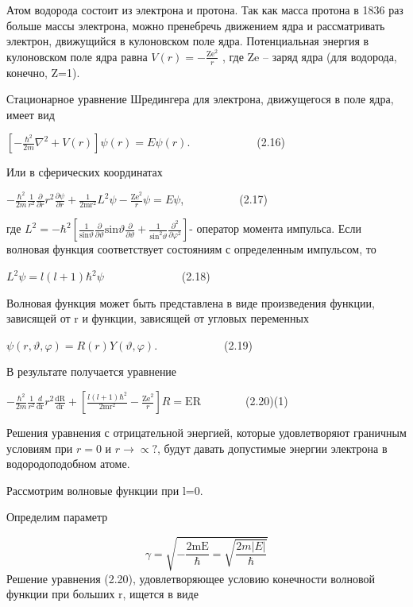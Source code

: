\documentclass[a4paper,14pt, openany, twoside, draft]{extbook} %
\begin{document}
Атом водорода состоит из электрона и протона. Так как масса протона в 1836 раз больше массы электрона, можно пренебречь движением ядра и рассматривать электрон, движущийся в кулоновском поле ядра. Потенциальная энергия в кулоновском поле ядра равна  $V(r)=-\frac{{\text{Ze}}^2} r$ , где Ze – заряд ядра (для водорода, конечно, Z=1).

Стационарное уравнение Шредингера для электрона, движущегося в поле ядра, имеет вид

 $\left[-\frac{\hbar ^2}{2m}\nabla ^2+V(r)\right]\psi (r)=\mathit{E\psi }(r)$.\ \ \ \ \ \ \ \ \ \ \ \ (2.16)

Или в сферических координатах

 $-\frac{\hbar ^2}{2m}\frac 1{r^2}\frac{\partial }{\partial r}r^2\frac{\partial \psi }{\partial r}+\frac 1{2{\text{mr}}^2}L^2\psi -\frac{{\text{Ze}}^2} r\psi =\mathit{E\psi }$,\ \ \ \ \ \ \ \ \ \ (2.17)

где  $L^2=-\hbar ^2\left[\frac 1{\text{sin}\vartheta }\frac{\partial }{\partial \vartheta }\text{sin}\vartheta \frac{\partial }{\partial \vartheta }+\frac 1{\text{sin}^2\vartheta }\frac{\partial ^2}{\partial \varphi ^2}\right]${}- оператор момента импульса. Если волновая функция соответствует состояниям с определенным импульсом, то

 $L^2\psi =l(l+1)\hbar ^2\psi $\ \ \ \ \ \ \ \ \ \ \ \ \ \ (2.18)

Волновая функция может быть представлена в виде произведения функции, зависящей от r и функции, зависящей от угловых переменных

 $\psi (r,\vartheta ,\varphi )=R(r)Y(\vartheta ,\varphi )$.\ \ \ \ \ \ \ \ \ \ \ \ (2.19)

В результате получается уравнение

 $-\frac{\hbar ^2}{2m}\frac 1{r^2}\frac d{{\text{dr}}}r^2\frac{{\text{dR}}}{{\text{dr}}}+\left[\frac{l(l+1)\hbar ^2}{2{\text{mr}}^2}-\frac{{\text{Ze}}^2} r\right]R={\text{ER}}$\ \ \ \ \ \ \ \ (2.20)(1)

Решения уравнения с отрицательной энергией, которые удовлетворяют граничным условиям при  $r=0$ и  $r\rightarrow \propto ?$, будут давать допустимые энергии электрона в водородоподобном атоме.

Рассмотрим волновые функции при l=0.

Определим параметр

\begin{equation*}
\gamma =\sqrt{-\frac{2{\text{mE}}}{\hbar }=\sqrt{\frac{2m|E|}{\hbar }}}
\end{equation*}
Решение уравнения (2.20), удовлетворяющее условию конечности волновой функции при больших r, ищется в виде
\end{document}
